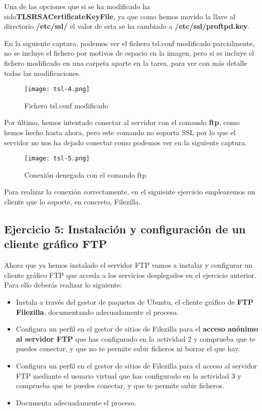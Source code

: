 Una de las opciones que si se ha modificado ha sido\textbf{TLSRSACertificateKeyFile}, ya que como hemos movido la llave al directorio \textbf{/etc/ssl/} el valor de esta se ha cambiado a \textbf{/etc/ssl/proftpd.key}.

En la siguiente captura, podemos ver el fichero tsl.conf modificado parcialmente, no se incluye el fichero por motivos de espacio en la imagen, pero si se incluye el fichero modificado en una carpeta aparte en la tarea, para ver con más detalle todas las modificaciones.

\begin{figure}[H]
    \centering
    \texttt{[image: tsl-4.png]}
    \caption{Fichero tsl.conf modificado}
\end{figure}

Por último, hemos intentado conectar al servidor con el comando \textbf{ftp}, como hemos hecho hasta ahora, pero este
comando no soporta SSL por lo que el servidor no nos ha dejado conectar como podemos ver en la siguiente captura.

\begin{figure}[H]
    \centering
    \texttt{[image: tsl-5.png]}
    \caption{Conexión denegada con el comando ftp}
\end{figure}

Para realizar la conexión correctamente, en el siguiente ejercicio emplearemos un cliente que lo soporte, en concreto, Filezilla.

\subsection{Ejercicio 5: Instalación y configuración de un cliente gráfico FTP}
Ahora que ya hemos instalado el servidor FTP vamos a instalar y configurar un cliente gráfico FTP que acceda a los servicios desplegados en el ejercicio anterior. Para ello deberás realizar lo siguiente:
\begin{itemize}
    \item Instala a través del gestor de paquetes de Ubuntu, el cliente gráfico de \textbf{FTP Filezilla}, documentando adecuadamente el proceso.
    \item Configura un perfil en el gestor de sitios de Filezilla para el \textbf{acceso anónimo al servidor FTP} que has configurado en la actividad 2 y comprueba que te puedes conectar, y que no te permite subir ficheros ni borrar el que hay.
    \item Configura un perfil en el gestor de sitios de Filezilla para el acceso al servidor FTP mediante el usuario virtual que has configurado en la actividad 3 y comprueba que te puedes conectar, y que te permite subir ficheros.
    \item Documenta adecuadamente el proceso.
\end{itemize}

